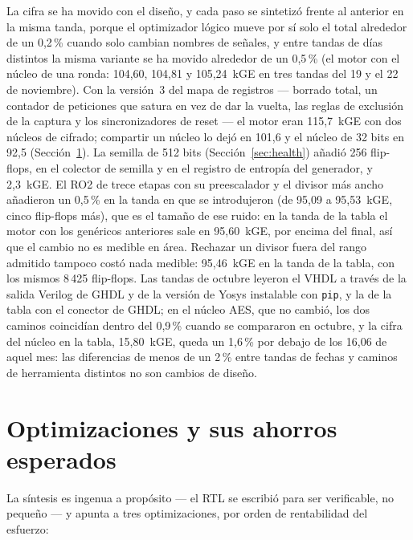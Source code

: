 La cifra se ha movido con el diseño, y cada paso se sintetizó frente al
anterior en la misma tanda, porque el optimizador lógico mueve por sí
solo el total alrededor de un 0,2\,\% cuando solo cambian nombres de
señales, y entre tandas de días distintos la misma variante se ha movido
alrededor de un 0,5\,\% (el motor con el núcleo de una ronda: 104,60,
104,81 y 105,24~kGE en tres tandas del 19 y el 22 de noviembre). Con la
versión~3 del mapa de registros --- borrado total, un
contador de peticiones que satura en vez de dar la vuelta, las reglas de
exclusión de la captura y los sincronizadores de reset --- el motor eran
115,7~kGE con dos núcleos de cifrado; compartir un núcleo lo dejó en
101,6 y el núcleo de 32 bits en 92,5 (Sección~\ref{sec:opt}). La semilla
de 512 bits (Sección~\ref{sec:health}) añadió 256 flip-flops, en el
colector de semilla y en el registro de entropía del generador, y
2,3~kGE. El RO2 de trece etapas con su preescalador y el divisor más
ancho añadieron un 0,5\,\% en la tanda en que se introdujeron (de 95,09
a 95,53~kGE, cinco flip-flops más), que es el tamaño de ese ruido: en la
tanda de la tabla el motor con los genéricos anteriores sale en
95,60~kGE, por encima del final, así que el cambio no es medible en
área. Rechazar un divisor fuera del rango admitido tampoco costó nada
medible: 95,46~kGE en la tanda de
la tabla, con los mismos 8\,425 flip-flops. Las tandas de octubre leyeron
el \ac{VHDL} a través de la salida Verilog de GHDL y de la versión de
Yosys instalable con \texttt{pip}, y la de la tabla con el conector de
GHDL; en el núcleo AES, que no cambió, los dos caminos coincidían dentro
del 0,9\,\% cuando se compararon en octubre, y la cifra del núcleo en la
tabla, 15,80~kGE, queda un 1,6\,\% por debajo de los 16,06 de aquel mes:
las diferencias de menos de un 2\,\% entre tandas de fechas y caminos de
herramienta distintos no son cambios de diseño.

\section{Optimizaciones y sus ahorros esperados}
\label{sec:opt}

La síntesis es ingenua a propósito --- el \ac{RTL} se escribió para ser
verificable, no pequeño --- y apunta a tres optimizaciones, por orden de
rentabilidad del esfuerzo:

